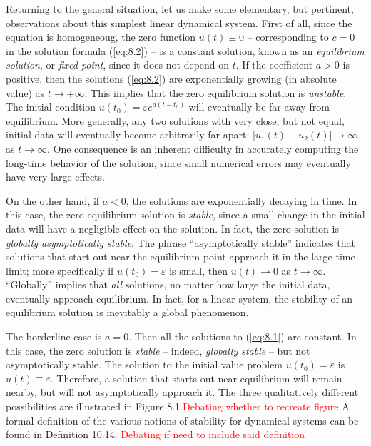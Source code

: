\documentclass[12pt]{article}
\theoremstyle{remark}
\begin{document}
Returning to the general situation, let us make some elementary, but pertinent, observations about this simplest linear dynamical system. First of all, since the equation is homogeneoug, the zero function $u(t)\equiv 0$ -- corresponding to $c=0$ in the solution formula (\ref{eq:8.2}) -- is a constant solution, known as an \emph{equilibrium solution}, or \emph{fixed point}, since it does not depend on $t$. If the coefficient $a>0$ is positive, then the solutions (\ref{eq:8.2}) are exponentially growing (in absolute value) as $t\to +\infty$. This implies that the zero equilibrium solution is \emph{unstable}. The initial condition $u(t_0)=\varepsilon e^{a(t-t_0)}$ will eventually be far away from equilibrium. More generally, any two solutions with very close, but not equal, initial data will eventually become arbitrarily far apart: $\lvert u_1(t)-u_2(t)\rvert \to \infty$ as $t\to\infty$. One consequence is an inherent difficulty in accurately computing the long-time behavior of the solution, since small numerical errors may eventually have very large effects.

On the other hand, if $a<0$, the solutions are exponentially decaying in time. In this case, the zero equilibrium solution is \emph{stable}, since a small change in the initial data will have a negligible effect on the solution. In fact, the zero solution is \emph{globally asymptotically stable}. The phrase ``asymptotically stable'' indicates that solutions that start out near the equilibrium point approach it in the large time limit; more specifically if $u(t_0)=\varepsilon$ is small, then $u(t)\to 0$ as $t\to\infty$. ``Globally'' implies that \emph{all} solutions, no matter how large the initial data, eventually approach equilibrium. In fact, for a linear system, the stability of an equilibrium solution is inevitably a global phenomenon.

The borderline case is $a=0$. Then all the solutions to (\ref{eq:8.1}) are constant. In this case, the zero solution is \emph{stable} -- indeed, \emph{globally stable} -- but not asymptotically stable. The solution to the initial value problem $u(t_0)=\varepsilon$ is $u(t)\equiv \varepsilon$. Therefore, a solution that starts out near equilibrium will remain nearby, but will not asymptotically approach it. The three qualitatively different possibilities are illustrated in Figure 8.1.\textcolor{red}{Debating whether to recreate figure} A formal definition of the various notions of stability for dynamical systems can be found in Definition 10.14. \textcolor{red}{Debating if need to include said definition}
\end{document}
